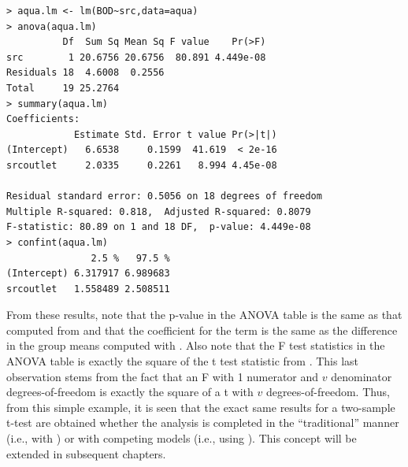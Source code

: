\documentclass[10pt,openany]{book}\usepackage[]{graphicx}\usepackage[]{color}
\makeatletter
\newenvironment{kframe}{%
 \def\at@end@of@kframe{}%
 \ifinner\ifhmode%
  \def\at@end@of@kframe{\end{minipage}}%
  \begin{minipage}{\columnwidth}%
 \fi\fi%
 \def\FrameCommand##1{\hskip\@totalleftmargin \hskip-\fboxsep
 \colorbox{shadecolor}{##1}\hskip-\fboxsep
     \hskip-\linewidth \hskip-\@totalleftmargin \hskip\columnwidth}%
 \MakeFramed {\advance\hsize-\width
   \@totalleftmargin\z@ \linewidth\hsize
   \@setminipage}}%
 {\par\unskip\endMakeFramed%
 \at@end@of@kframe}
\newenvironment{knitrout}{}{} %
\makeatother
\begin{document}
\begin{knitrout}
\color{fgcolor}\begin{kframe}
\begin{verbatim}
> aqua.lm <- lm(BOD~src,data=aqua)
> anova(aqua.lm)
          Df  Sum Sq Mean Sq F value    Pr(>F)
src        1 20.6756 20.6756  80.891 4.449e-08
Residuals 18  4.6008  0.2556                  
Total     19 25.2764                          
> summary(aqua.lm)
Coefficients:
            Estimate Std. Error t value Pr(>|t|)
(Intercept)   6.6538     0.1599  41.619  < 2e-16
srcoutlet     2.0335     0.2261   8.994 4.45e-08

Residual standard error: 0.5056 on 18 degrees of freedom
Multiple R-squared: 0.818,	Adjusted R-squared: 0.8079 
F-statistic: 80.89 on 1 and 18 DF,  p-value: 4.449e-08 
> confint(aqua.lm)
               2.5 %   97.5 %
(Intercept) 6.317917 6.989683
srcoutlet   1.558489 2.508511
\end{verbatim}
\end{kframe}
\end{knitrout}

From these results, note that the p-value in the ANOVA table is the same as that computed from  and that the coefficient for the  term is the same as the difference in the group means computed with .  Also note that the F test statistics in the ANOVA table is exactly the square of the t test statistic from .  This last observation stems from the fact that an F with 1 numerator and $v$ denominator degrees-of-freedom is exactly the square of a t with $v$ degrees-of-freedom.  Thus, from this simple example, it is seen that the exact same results for a two-sample t-test are obtained whether the analysis is completed in the ``traditional'' manner (i.e., with ) or with competing models (i.e., using ).  This concept will be extended in subsequent chapters.
\end{document}
